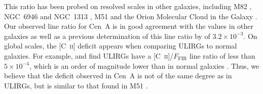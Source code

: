 \documentclass[preprint2]{aastex}
\begin{document}
This ratio has been probed on resolved scales in other galaxies, including M82 \citep[10$^{-3}-10^{-2}$; ][]{2013A&A...549A.118C}, NGC~6946 and NGC~1313 \citep[$8\times 10^{-3}$; ][]{2002AJ....124..751C}, M51 \citep[$4 \times 10^{-3}$; ][]{parkin_2013} and the Orion Molecular Cloud in the Galaxy \citep[$3 \times 10^{-3}$; ][]{1993ApJ...404..219S}.  Our observed line ratio for Cen~A is in good agreement with the values in other galaxies as well as a previous determination of this line ratio by \citet{2001A&A...375..566N} of $3.2 \times 10^{-3}$.  On global scales, the [C~\textsc{ii}] deficit appears when comparing ULIRGs to normal galaxies.  For example, \citet{1998ApJ...504L..11L} and \citet{2003ApJ...594..758L} find ULIRGs have a [C~\textsc{ii}]/$F_{\mathrm{FIR}}$ line ratio of less than $5 \times 10^{-4}$, which is an order of magnitude lower than in normal galaxies \citep{1985ApJ...291..755C, 2001ApJ...561..766M, 2001A&A...375..566N}.  Thus, we believe that the deficit observed in Cen~A is not of the same degree as in ULIRGs, but is similar to that found in M51 \citep{parkin_2013}.
\end{document}
